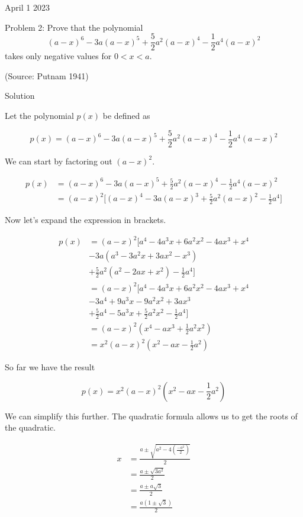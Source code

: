 April 1 2023

Problem 2: Prove that the polynomial
$$(a-x)^6 -3a(a-x)^5 +\frac{5}{2} a^2 (a-x)^4 -\frac{1}{2} a^4 (a-x)^2$$ takes only negative values for $0<x<a$.

(Source: Putnam 1941)

Solution

Let the polynomial $p(x)$ be defined as

$$p(x) = (a-x)^6 -3a(a-x)^5 +\frac{5}{2} a^2 (a-x)^4 -\frac{1}{2} a^4 (a-x)^2$$

We can start by factoring out $(a-x)^2$.

\begin{align*}
p(x) &= (a-x)^6 -3a(a-x)^5 +\frac{5}{2} a^2 (a-x)^4 -\frac{1}{2} a^4 (a-x)^2 \\
&= (a-x)^2 \Bigg[(a-x)^4 - 3a(a-x)^3 + \frac{5}{2} a^2 (a-x)^2 - \frac{1}{2} a^4\Bigg]
\end{align*}

Now let's expand the expression in brackets.

\begin{align*}
p(x) &= (a-x)^2 \Bigg[a^4 - 4a^3x + 6a^2x^2 - 4ax^3 + x^4 \\
& - 3a(a^3 - 3a^2x + 3ax^2 - x^3) \\
& + \frac{5}{2}a^2(a^2 - 2ax + x^2) - \frac{1}{2}a^4 \Bigg] \\
&= (a-x)^2 \Bigg[a^4 - 4a^3x + 6a^2x^2 - 4ax^3 + x^4 \\
& - 3a^4 + 9a^3x - 9a^2x^2 + 3ax^3 \\
& + \frac{5}{2}a^4 - 5a^3x + \frac{5}{2}a^2x^2 - \frac{1}{2}a^4 \Bigg] \\
&= (a-x)^2 (x^4 - ax^3 + \frac{1}{2}a^2x^2) \\
&= x^2 (a-x)^2 (x^2 - ax - \frac{1}{2}a^2)
\end{align*}

So far we have the result 

$$p(x) = x^2 (a-x)^2 (x^2 - ax - \frac{1}{2}a^2)$$

We can simplify this further. The quadratic formula allows us to get the roots of the quadratic.

\begin{align*}
x &= \frac{a \pm \sqrt{a^2 - 4 \left( \frac{-a^2}{2} \right)}}{2} \\
&= \frac{a \pm \sqrt{3a^2}}{2} \\
&= \frac{a \pm a\sqrt{3}}{2} \\
&= \frac{a(1 \pm \sqrt{3})}{2} \\
\end{align*}

